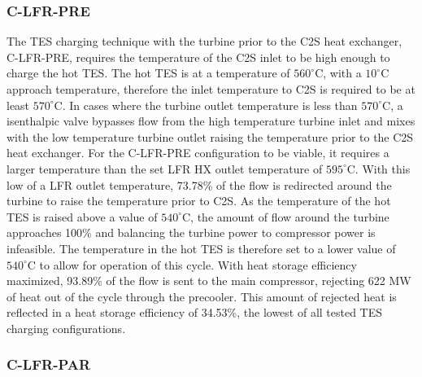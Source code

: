 \begin{paracol}{2}
\linenumbers
\switchcolumn

\subsubsection{C-LFR-PRE}
The TES charging technique with the turbine prior to the C2S heat exchanger, C-LFR-PRE, requires the temperature of the C2S inlet to be high enough to charge the hot TES. The hot TES is at a temperature of $560^{\circ}$C, with a $10^{\circ}$C approach temperature, therefore the inlet temperature to C2S is required to be at least $570^{\circ}$C. In cases where the turbine outlet temperature is less than $570^{\circ}$C, a isenthalpic valve bypasses flow from the high temperature turbine inlet and mixes with the low temperature turbine outlet raising the temperature prior to the C2S heat exchanger. For the C-LFR-PRE configuration to be viable, it requires a larger temperature than the set LFR HX outlet temperature of $595^{\circ}$C. With this low of a LFR outlet temperature, 73.78\% of the flow is redirected around the turbine to raise the temperature prior to C2S. As the temperature of the hot TES is raised above a value of $540^{\circ}$C, the amount of flow around the turbine approaches 100\% and balancing the turbine power to compressor power is infeasible. The temperature in the hot TES is therefore set to a lower value of $540^{\circ}$C to allow for operation of this cycle. With heat storage efficiency maximized, 93.89\% of the flow is sent to the main compressor, rejecting 622 MW of heat out of the cycle through the precooler. This amount of rejected heat is reflected in a heat storage efficiency of 34.53\%, the lowest of all tested TES charging configurations.

\subsubsection{C-LFR-PAR}


\end{paracol}
